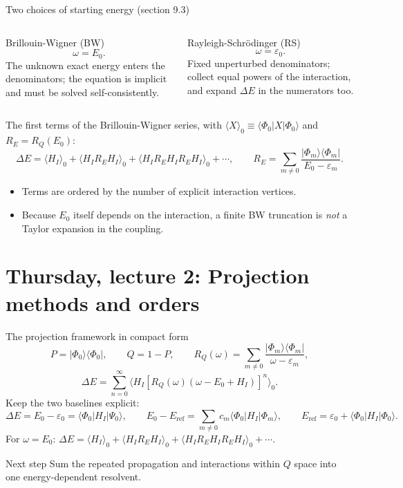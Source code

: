 \documentclass[aspectratio=169,10pt]{beamer}
\newcommand{\ket}[1]{\vert #1\rangle}
\newcommand{\bra}[1]{\langle #1\vert}
\newcommand{\mel}[3]{\langle #1\lvert #2\rvert #3\rangle}
\newcommand{\av}[1]{\langle #1\rangle_0}
\newcommand{\Eref}{E_{\mathrm{ref}}}
\newcommand{\ph}{\Phi_0}
\newcommand{\Psizero}{\Psi_0}
\begin{document}
\begin{frame}{Two choices of starting energy (section 9.3)}
\begin{columns}[T,onlytextwidth]
\begin{block}{Brillouin-Wigner (BW)}
\[\omega=E_0.\]
The unknown exact energy enters the denominators; the equation is implicit and must be solved self-consistently.
\end{block}
\begin{exampleblock}{Rayleigh-Schr\"odinger (RS)}
\[\omega=\varepsilon_0.\]
Fixed unperturbed denominators; collect equal powers of the interaction, and expand \(\Delta E\) in the numerators too.
\end{exampleblock}
\end{columns}
\vspace{0.8em}
The first terms of the Brillouin-Wigner series, with \(\av{X}\equiv\mel{\ph}{X}{\ph}\) and \(R_E=R_Q(E_0)\):
\[
\Delta E=\av{H_I}
+\av{H_I R_E H_I}
+\av{H_I R_E H_I R_E H_I}+\cdots ,
\qquad
R_E=\sum_{m\ne0}\frac{\ket{\Phi_m}\bra{\Phi_m}}{E_0-\varepsilon_m}.
\]
\begin{itemize}
\item Terms are ordered by the number of explicit interaction vertices.
\item Because \(E_0\) itself depends on the interaction, a finite BW truncation is \emph{not} a Taylor expansion in the coupling.
\end{itemize}
\end{frame}

\section{Thursday, lecture 2: Projection methods and orders}

\begin{frame}{The projection framework in compact form}
\[
P=\ket{\ph}\bra{\ph},\qquad Q=1-P,\qquad
R_Q(\omega)=\sum_{m\ne0}\frac{\ket{\Phi_m}\bra{\Phi_m}}{\omega-\varepsilon_m},
\]
\[
\Delta E=\sum_{n=0}^{\infty}
\av{H_I\left[R_Q(\omega)(\omega-E_0+H_I)\right]^n}.
\]
Keep the two baselines explicit:
\[
\Delta E=E_0-\varepsilon_0=\mel{\ph}{H_I}{\Psizero},\qquad
E_0-\Eref=\sum_{m\ne0}c_m\mel{\ph}{H_I}{\Phi_m},\qquad
\Eref=\varepsilon_0+\mel{\ph}{H_I}{\ph}.
\]
For \(\omega=E_0\): \(\Delta E=\av{H_I}+\av{H_I R_E H_I}+\av{H_I R_E H_I R_E H_I}+\cdots\).
\begin{block}{Next step}
Sum the repeated propagation and interactions within \(Q\) space into one energy-dependent resolvent.
\end{block}
\end{frame}
\end{document}
